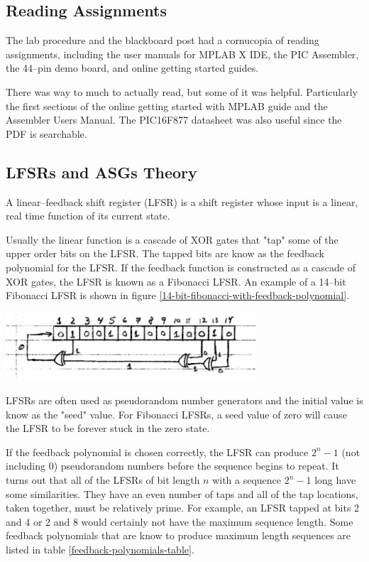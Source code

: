 \documentclass[11pt]{article}
\begin{document}
\subsection{Reading Assignments}

The lab procedure and the blackboard post had a cornucopia of reading assignments,
including the user manuals for MPLAB X IDE, the PIC Assembler, the 44--pin demo board,
and online getting started guides.

There was way to much to actually read, but some of it was helpful. Particularly
the first sections of the online getting started with MPLAB guide and the Assembler
Users Manual. The PIC16F877 datasheet was also useful since the PDF is searchable.

\subsection{LFSRs and ASGs Theory}

A linear--feedback shift register (LFSR) is a shift register whose input is a linear,
real time function of its current state.

Usually the linear function is a cascade of XOR gates that "tap" some of the upper
order bits on the LFSR. The tapped bits are know as the feedback polynomial for the
LFSR. If the feedback function is constructed as a cascade of XOR gates, the LFSR
is known as a Fibonacci LFSR. An example of a 14--bit Fibonacci LFSR is shown 
in figure \ref{14-bit-fibonacci-with-feedback-polynomial}.

\begin{center}
	\includegraphics[width=0.7\textwidth]{Figures/14-bit-fibonacci-with-feedback-polynomial.pdf}
	\label{14-bit-fibonacci-with-feedback-polynomial}
\end{center}

LFSRs are often used as pseudorandom number generators and the initial value is know
as the "seed" value. For Fibonacci LFSRs, a seed value of zero will cause the LFSR
to be forever stuck in the zero state.

If the feedback polynomial is chosen correctly, the LFSR can produce $2^{n}-1$
(not including 0) pseudorandom numbers before the sequence begins to repeat.
It turns out that all of the LFSRs of bit length $n$ with a sequence $2^{n}-1$
long have some similarities. They have an even number of taps and all of the tap
locations, taken together, must be relatively prime. For example, an LFSR tapped
at bits 2 and 4 or 2 and 8 would certainly not have the maximum sequence length.
Some feedback polynomials that are know to produce maximum length sequences are
listed in table \ref{feedback-polynomials-table}.
\end{document}
